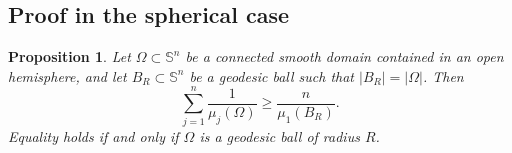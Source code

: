 \documentclass[11pt]{amsart}
\newtheorem{proposition}[theorem]{Proposition}
\theoremstyle{remark}
\newcommand{\Sn}{\mathbb S}
\begin{document}
\subsection{Proof in the spherical case}

\begin{proposition}\label{prop:spherical}
Let $\Omega\subset\Sn^n$ be a connected smooth domain contained in an open hemisphere, and let $B_R\subset\Sn^n$ be a geodesic ball such that $|B_R|=|\Omega|$.  Then
\begin{equation}\label{eq:spherical-conclusion}
        \sum_{j=1}^n\frac1{\mu_j(\Omega)}
        \ge
        \frac{n}{\mu_1(B_R)}.
\end{equation}
Equality holds if and only if $\Omega$ is a geodesic ball of radius $R$.
\end{proposition}
\end{document}
